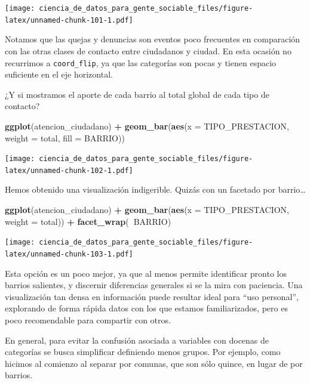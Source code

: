 \documentclass[]{book}
\newenvironment{Shaded}{\begin{snugshade}}{\end{snugshade}}
\newcommand{\KeywordTok}[1]{\textcolor[rgb]{0.13,0.29,0.53}{\textbf{#1}}}
\newcommand{\DataTypeTok}[1]{\textcolor[rgb]{0.13,0.29,0.53}{#1}}
\newcommand{\StringTok}[1]{\textcolor[rgb]{0.31,0.60,0.02}{#1}}
\newcommand{\OperatorTok}[1]{\textcolor[rgb]{0.81,0.36,0.00}{\textbf{#1}}}
\newcommand{\NormalTok}[1]{#1}
\begin{document}
\texttt{[image: ciencia\_de\_datos\_para\_gente\_sociable\_files/figure-latex/unnamed-chunk-101-1.pdf]}

Notamos que las quejas y denuncias son eventos poco frecuentes en
comparación con las otras clases de contacto entre ciudadanos y ciudad.
En esta ocasión no recurrimos a \texttt{coord\_flip}, ya que las
categorías son pocas y tienen espacio suficiente en el eje horizontal.

¿Y si mostramos el aporte de cada barrio al total global de cada tipo de
contacto?

\begin{Shaded}
\begin{Highlighting}[]
\KeywordTok{ggplot}\NormalTok{(atencion_ciudadano) }\OperatorTok{+}
\StringTok{    }\KeywordTok{geom_bar}\NormalTok{(}\KeywordTok{aes}\NormalTok{(}\DataTypeTok{x =}\NormalTok{ TIPO_PRESTACION, }\DataTypeTok{weight =}\NormalTok{ total, }\DataTypeTok{fill =}\NormalTok{ BARRIO)) }
\end{Highlighting}
\end{Shaded}

\texttt{[image: ciencia\_de\_datos\_para\_gente\_sociable\_files/figure-latex/unnamed-chunk-102-1.pdf]}

Hemos obtenido una visualización indigerible. Quizás con un facetado por
barrio\ldots{}

\begin{Shaded}
\begin{Highlighting}[]
\KeywordTok{ggplot}\NormalTok{(atencion_ciudadano) }\OperatorTok{+}
\StringTok{    }\KeywordTok{geom_bar}\NormalTok{(}\KeywordTok{aes}\NormalTok{(}\DataTypeTok{x =}\NormalTok{ TIPO_PRESTACION, }\DataTypeTok{weight =}\NormalTok{ total)) }\OperatorTok{+}
\StringTok{    }\KeywordTok{facet_wrap}\NormalTok{(}\OperatorTok{~}\NormalTok{BARRIO)}
\end{Highlighting}
\end{Shaded}

\texttt{[image: ciencia\_de\_datos\_para\_gente\_sociable\_files/figure-latex/unnamed-chunk-103-1.pdf]}

Esta opción es un poco mejor, ya que al menos permite identificar pronto
los barrios salientes, y discernir diferencias generales si se la mira
con paciencia. Una visualización tan densa en información puede resultar
ideal para ``uso personal'', explorando de forma rápida datos con los
que estamos familiarizados, pero es poco recomendable para compartir con
otros.

En general, para evitar la confusión asociada a variables con docenas de
categorías se busca simplificar definiendo menos grupos. Por ejemplo,
como hicimos al comienzo al separar por comunas, que son sólo quince, en
lugar de por barrios.
\end{document}
